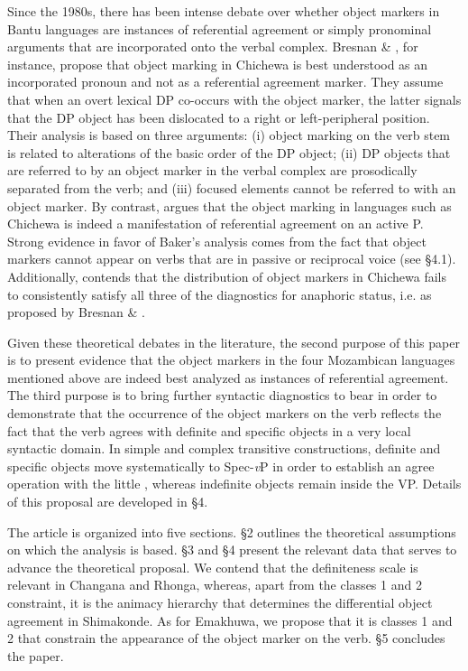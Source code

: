 \documentclass[output=paper]{langsci/langscibook}
\begin{document}
Since the 1980s, there has been intense debate over whether object markers in Bantu languages are instances of referential agreement or simply pronominal arguments that are incorporated onto the verbal complex. Bresnan \& \citet{Mchombo1987}, for instance, propose that object marking in Chichewa is best understood as an incorporated pronoun and not as a referential agreement marker. They assume that when an overt lexical DP co-occurs with the object marker, the latter signals that the DP object has been dislocated to a right or left-peripheral position. Their analysis is based on three arguments: (i) object marking on the verb stem is related to alterations of the basic order of the DP object; (ii) DP objects that are referred to by an object marker in the verbal complex are prosodically separated from the verb; and (iii) focused elements cannot be referred to with an object marker. By contrast, \citet{Baker2008} argues that the object marking in languages such as Chichewa is indeed a manifestation of referential agreement on an active P. Strong evidence in favor of Baker’s analysis comes from the fact that object markers cannot appear on verbs that are in passive or reciprocal voice (see §4.1). Additionally, \citet{Downing2014} contends that the distribution of object markers in Chichewa fails to consistently satisfy all three of the diagnostics for anaphoric status, i.e. as proposed by Bresnan \& \citet{Mchombo1987}.

Given these theoretical debates in the literature, the second purpose of this paper is to present evidence that the object markers in the four Mozambican languages mentioned above are indeed best analyzed as instances of referential agreement. The third purpose is to bring further syntactic diagnostics to bear in order to demonstrate that the occurrence of the object markers on the verb reflects the fact that the verb agrees with definite and specific objects in a very local syntactic domain. In simple and complex transitive constructions, definite and specific objects move systematically to Spec-\textit{v}P in order to establish an agree operation with the little , whereas indefinite objects remain inside the VP. Details of this proposal are developed in §4.

The article is organized into five sections. §2 outlines the theoretical assumptions on which the analysis is based. §3 and §4 present the relevant data that serves to advance the theoretical proposal. We contend that the definiteness scale is relevant in Changana and Rhonga, whereas, apart from the classes 1 and 2 constraint, it is the animacy hierarchy that determines the differential object agreement in Shimakonde. As for Emakhuwa, we propose that it is classes 1 and 2 that constrain the appearance of the object marker on the verb. §5 concludes the paper.
\end{document}
